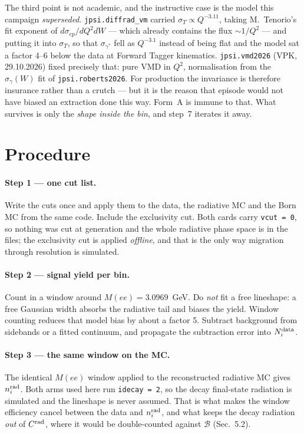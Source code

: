 \documentclass[11pt]{article}
\newcommand{\crad}{C^{\rm rad}}
\newcommand{\BR}{\mathcal{B}}
\begin{document}
The third point is not academic, and the instructive case is the model this campaign
\emph{superseded}. \texttt{jpsi.diffrad\_vm} carried $\sigma_T\propto Q^{-3.11}$, taking
M.~Tenorio's fit exponent of $d\sigma_{ep}/dQ^2dW$ --- which already contains the flux $\sim1/Q^2$
--- and putting it into $\sigma_T$, so that $\sigma_{\gamma^*}$ fell as $Q^{-3.1}$ instead of being
flat and the model sat a factor 4--6 below the data at Forward Tagger kinematics.
\texttt{jpsi.vmd2026} (VPK, 29.10.2026) fixed precisely that: pure VMD in $Q^2$, normalisation from
the $\sigma_\gamma(W)$ fit of \texttt{jpsi.roberts2026}. For production the invariance is therefore
insurance rather than a crutch --- but it is the reason that episode would not have biased an
extraction done this way. Form~A is immune to
that. What survives is only the \emph{shape inside the bin}, and step~7 iterates it away.

\section{Procedure}

\paragraph{Step 1 --- one cut list.}
Write the cuts once and apply them to the data, the radiative MC and the Born MC from the same code.
Include the exclusivity cut. Both cards carry \texttt{vcut = 0}, so nothing was cut at generation
and the whole radiative phase space is in the files; the exclusivity cut is applied \emph{offline},
and that is the only way migration through resolution is simulated.

\paragraph{Step 2 --- signal yield per bin.}
Count in a window around $M(ee)=3.0969$~GeV. Do \emph{not} fit a free lineshape: a free Gaussian
width absorbs the radiative tail and biases the yield. Window counting reduces that model bias by
about a factor 5. Subtract background from sidebands or a fitted continuum, and propagate the
subtraction error into $N_i^{\rm data}$.

\paragraph{Step 3 --- the same window on the MC.}
The identical $M(ee)$ window applied to the reconstructed radiative MC gives $n_i^{\rm rad}$. Both
arms used here run \texttt{idecay = 2}, so the decay final-state radiation is simulated and the
lineshape is never assumed. That is what makes the window efficiency cancel between the data and
$n_i^{\rm rad}$, and what keeps the decay radiation \emph{out} of $\crad$, where it would be
double-counted against $\BR$ (Sec.~5.2).
\end{document}
